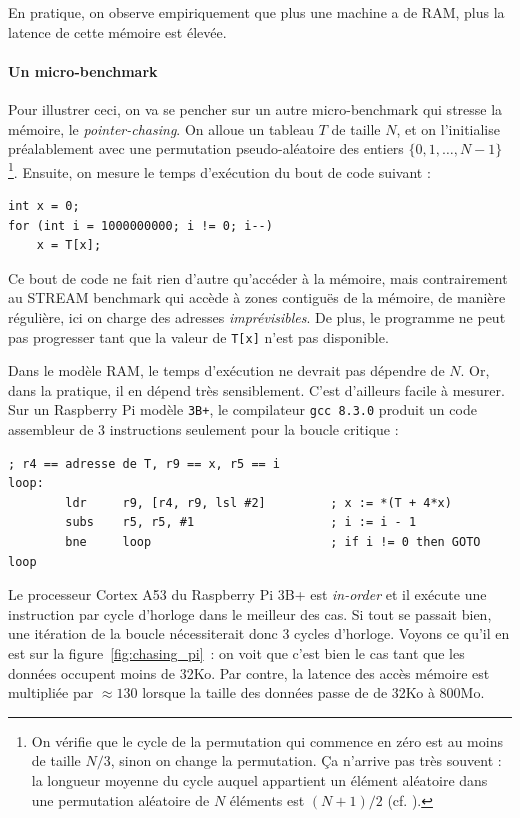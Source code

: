 En pratique, on observe empiriquement que plus une machine a de RAM, plus la
latence de cette mémoire est élevée.

\paragraph{Un micro-benchmark} Pour illustrer ceci, on va se pencher sur un
autre micro-benchmark qui stresse la mémoire, le \emph{pointer-chasing}. On
alloue un tableau $T$ de taille $N$, et on l'initialise préalablement avec une
permutation pseudo-aléatoire des entiers $\{0, 1, \dots, N-1\}$\footnote{On
  vérifie que le cycle de la permutation qui commence en zéro est au moins de
  taille $N/3$, sinon on change la permutation. Ça n'arrive pas très souvent :
  la longueur moyenne du cycle auquel appartient un élément aléatoire dans une
  permutation aléatoire de $N$ éléments est $(N+1)/2$ (cf. \cite[§1.3.3,
  exercice 24]{knuth}).}. Ensuite, on mesure le temps d'exécution du bout de
code suivant :
\begin{verbatim}
int x = 0;
for (int i = 1000000000; i != 0; i--)
	x = T[x];
\end{verbatim}

Ce bout de code ne fait rien d'autre qu'accéder à la mémoire, mais contrairement
au \textsf{STREAM} benchmark qui accède à zones contiguës de la mémoire, de
manière régulière, ici on charge des adresses \emph{imprévisibles}. De plus, le
programme ne peut pas progresser tant que la valeur de \texttt{T[x]} n'est pas
disponible.

Dans le modèle RAM, le temps d'exécution ne devrait pas dépendre de $N$.  Or,
dans la pratique, il en dépend très sensiblement. C'est d'ailleurs facile à
mesurer. Sur un Raspberry Pi modèle \texttt{3B+}, le compilateur
\texttt{gcc~8.3.0} produit un code assembleur de 3 instructions seulement pour
la boucle critique :
\begin{verbatim}
; r4 == adresse de T, r9 == x, r5 == i
loop:
        ldr     r9, [r4, r9, lsl #2]         ; x := *(T + 4*x)
        subs    r5, r5, #1                   ; i := i - 1
        bne     loop                         ; if i != 0 then GOTO loop
\end{verbatim}

Le processeur Cortex A53 du Raspberry Pi 3B+ est \emph{in-order} et il exécute
une instruction par cycle d'horloge dans le meilleur des cas. Si tout se passait
bien, une itération de la boucle nécessiterait donc 3 cycles d'horloge. Voyons
ce qu'il en est sur la figure~\ref{fig:chasing_pi}~: on voit que c'est bien le
cas tant que les données occupent moins de 32Ko. Par contre, la latence des
accès mémoire est multipliée par $\approx 130$ lorsque la taille des données
passe de de 32Ko à 800Mo.


